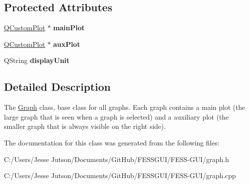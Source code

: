 \subsection*{Protected Attributes}
\begin{DoxyCompactItemize}
\item 
\hypertarget{class_graph_a02239013b745a7c1411a7f8623cc2073}{}\label{class_graph_a02239013b745a7c1411a7f8623cc2073} 
\hyperlink{class_q_custom_plot}{Q\+Custom\+Plot} $\ast$ {\bfseries main\+Plot}
\item 
\hypertarget{class_graph_ac7d10642e5439fd87d7d4bc5a33e643d}{}\label{class_graph_ac7d10642e5439fd87d7d4bc5a33e643d} 
\hyperlink{class_q_custom_plot}{Q\+Custom\+Plot} $\ast$ {\bfseries aux\+Plot}
\item 
\hypertarget{class_graph_a28488c31277fec31c8d54a44860efede}{}\label{class_graph_a28488c31277fec31c8d54a44860efede} 
Q\+String {\bfseries display\+Unit}
\end{DoxyCompactItemize}


\subsection{Detailed Description}
The \hyperlink{class_graph}{Graph} class, base class for all graphs. Each graph contains a main plot (the large graph that is seen when a graph is selected) and a auxiliary plot (the smaller graph that is always visible on the right side). 

The documentation for this class was generated from the following files\+:\begin{DoxyCompactItemize}
\item 
C\+:/\+Users/\+Jesse Jutson/\+Documents/\+Git\+Hub/\+F\+E\+S\+S\+G\+U\+I/\+F\+E\+S\+S-\/\+G\+U\+I/graph.\+h\item 
C\+:/\+Users/\+Jesse Jutson/\+Documents/\+Git\+Hub/\+F\+E\+S\+S\+G\+U\+I/\+F\+E\+S\+S-\/\+G\+U\+I/graph.\+cpp\end{DoxyCompactItemize}
